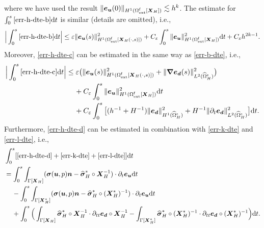 \documentclass[11pt,reqno]{amsart}
\theoremstyle{definition}
\theoremstyle{plain}
\numberwithin{theorem}{section}
\numberwithin{proposition}{section}
\numberwithin{lemma}{section}
\numberwithin{equation}{section}
\newcommand{\bs}[1]{\boldsymbol{#1}}
\newcommand{\uu}[1]  {{\bs{#1}} }
\newcommand{\dep}{{{\bs{d}}}}
\newcommand{\grad}   { \uu{\nabla}    }
\def\d{\mathrm{d}}
\newcommand{\bu}{\uu{u}}
\renewcommand{\(}{\bigl(}
\renewcommand{\)}{\bigr)}
\begin{document}
where we have used the result $\|{\bs e}_{\bs u}(0)\|_{H^1(\Omega^{\rm f}_{\rm ext}[\bs X_H])} \lesssim h^k$. The estimate for $\int_0^s \eqref{err-h-dte-b} \d t$ is similar (details are omitted), i.e., 
\begin{align}
\Big|\int_0^s \eqref{err-h-dte-b} \d t \Big|
\le \varepsilon
 \|{\bs e}_{\bs u}(s)\|_{H^1(\Omega^{\rm f}_{\rm ext}[{\bs X}_H(\cdot,s)])}^2 
+ C_{\varepsilon}\int_0^s 
\|{\bs e}_{\bs u}\|_{H^1(\Omega^{\rm f}_{\rm ext}[{\bs X}_H])}^2 \d t 
+ C_{\varepsilon}h^{2k-1}. 
\end{align}
Moreover, \eqref{err-h-dte-c} can be estimated in the same way as \eqref{err-b-dte}, i.e.,
\begin{align}
\Big|\int_0^s \eqref{err-h-dte-c} \d t\Big|
&\le \varepsilon
\big( \|{\bs e}_{\bs u}(s)\|_{H^1(\Omega^{\rm f}_{\rm ext}[{\bs X}_H(\cdot,s)])}^2 + \|\grad{\bs e}_{\bs d}(s)\|_{L^2(\widehat\Omega^{\rm s}_H)}^2 \big) \notag\\
&\quad\,
+ C_\varepsilon\int_0^s 
\|{\bs e}_{\bs u}\|_{H^1(\Omega^{\rm f}_{\rm ext}[{\bs X}_H])}^2 \d t\notag\\
&\quad\,
+ C_\varepsilon\int_0^s 
\big[ (h^{-1}+H^{-1})\|{\bs e}_{\bs d}\|_{H^1(\widehat\Omega^{\rm s}_H)}^2 
+ H^{-1}\|\partial_t{\bs e}_{\bs d}\|_{L^2(\widehat\Omega^{\rm s}_H)}^2 \big]\d t .
\end{align}
Furthermore, \eqref{err-h-dte-d} can be estimated in combination with \eqref{err-k-dte} and \eqref{err-l-dte}, i.e., 
\begin{subequations}\label{err-hjk-dte}
\begin{align}
&\int_0^s [ \eqref{err-h-dte-d} + \eqref{err-k-dte} + \eqref{err-l-dte} ] \d t \notag\\
&= \int_0^s  \int_{\Gamma[\bs X_H]} ({\bs\sigma}(\bu,p){\bs n} - {\widehat{\bs\sigma}}_H^*\circ{\bs X}_H^{-1}) \cdot \partial_t {\bs e}_{\bs u} \d t\label{err-hjk-dte-a}\\
&\quad\, 
- \int_0^s \int_{\Gamma[\bs X_H^*]} ({\bs\sigma}(\bu,p){\bs n} - {\widehat{\bs \sigma} }_H^* \circ({\bs X}_H^*)^{-1}) \cdot \partial_t {\bs e}_{\bs u} \d t\label{err-hjk-dte-b}\\
&\quad\,  
+ \int_0^s \Big( \int_{\Gamma[\bs X_H]} {\widehat{\bs\sigma}}_H^*\circ{\bs X}_H^{-1} \cdot \partial_{tt}{\bs e}_\dep \circ{\bs X}_H^{-1} - \int_{\Gamma[\bs X_H^*]} {\widehat{\bs \sigma} }_H^* \circ({\bs X}_H^*)^{-1} \cdot \partial_{tt}{\bs e}_\dep \circ({\bs X}_H^*)^{-1} \Big)\d t .\label{err-hjk-dte-c}
\end{align}
\end{subequations}
\end{document}

